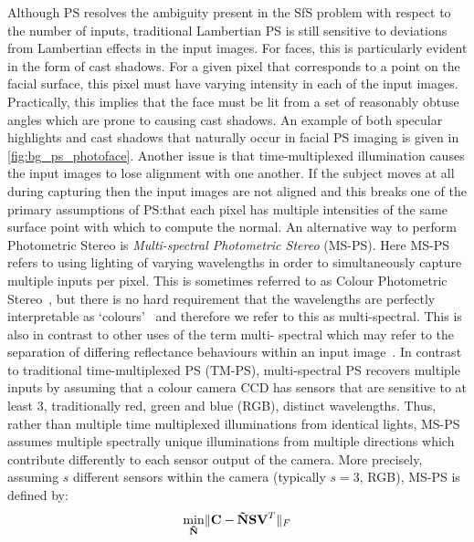 Although PS resolves the ambiguity present in the SfS problem with respect
to the number of inputs, traditional Lambertian PS is still sensitive to
deviations from Lambertian effects in the input images. For faces, this
is particularly evident in the form of cast shadows. For a given pixel that
corresponds to a point on the facial surface, this pixel must have varying
intensity in each of the input images. Practically, this implies that the face
must be lit from a set of reasonably obtuse angles which are prone to causing
cast shadows. An example of both specular highlights and cast shadows that
naturally occur in facial PS imaging is given in \cref{fig:bg_ps_photoface}.
Another issue is that time-multiplexed illumination causes the input
images to lose alignment with one another. If the subject moves at all
during capturing then the input images are not aligned and this breaks
one of the primary assumptions of PS:\@ that each pixel has multiple intensities
of the same surface point with which to compute the normal. An alternative
way to perform Photometric Stereo is
\textit{Multi-spectral Photometric Stereo} (MS-PS). Here MS-PS refers to
using lighting of varying wavelengths in order to simultaneously capture
multiple inputs per pixel. This is sometimes referred to as
Colour Photometric Stereo~\cite{petrov1987light,woodham1994gradient,%
kontsevich1994reconstruction,hernandez2007non},
but there is no hard requirement that the wavelengths are perfectly
interpretable as `colours'~\cite{fyffe2011single} and therefore we refer to this
as multi-spectral. This is also in contrast to other uses of the term multi-
spectral which may refer to the separation of differing reflectance behaviours
within an input image~\cite{nayar1997separation,mallick2005beyond,zickler2008color}.
In contrast to traditional time-multiplexed PS (TM-PS), multi-spectral PS
recovers multiple inputs by assuming that a colour camera CCD has sensors that
are sensitive to at least 3, traditionally red, green and blue (RGB), distinct
wavelengths. Thus, rather than multiple time multiplexed illuminations from
identical lights, MS-PS assumes multiple spectrally unique illuminations from
multiple directions which contribute differently to each sensor output
of the camera. More precisely, assuming $s$ different sensors within the camera
(typically $s = 3$, RGB), MS-PS is defined by:
\begin{equation}\label{eg:bg_ps_lambertian_ms_ps}
	 \min_{\boldsymbol{\mathbf{\tilde{N}}}} \lVert \boldsymbol{\mathbf{C}} - \boldsymbol{\mathbf{\tilde{N}}} \boldsymbol{\mathbf{S}} \boldsymbol{\mathbf{V}}^T \rVert_F
\end{equation}
